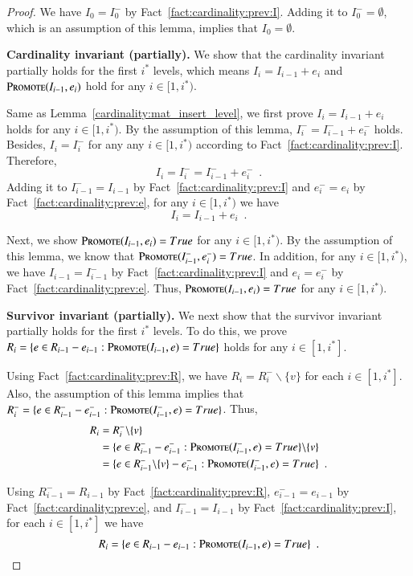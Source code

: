 \documentclass[11pt]{article}
\newcommand{\replacementTester}{\textsc{Promote}}
\begin{document}
\begin{proof}
We have $I_0=I_0^-$ by Fact~\ref{fact:cardinality:prev:I}.
Adding it to $I_0^-=\emptyset$, which is an assumption of this lemma, implies that $I_0 = \emptyset$.


\textbf{Cardinality invariant (partially). }
We show that the cardinality invariant partially holds for the first $i^*$ levels,  which means $I_i = I_{i-1} + e_i$ and $\replacementTester{}(I_{i-1}, e_i)$ hold for any $i\in[1,i^*)$.

Same as Lemma~\ref{cardinality:mat_insert_level}, we first prove $I_i = I_{i-1} + e_i$ holds for any $i\in[1,i^*)$.
By the assumption of this lemma, $I_{i}^-=I_{i - 1}^- + e_i^-$ holds.
Besides, $I_i = I_i^-$  for any any $i\in[1,i^*)$ according to Fact~\ref{fact:cardinality:prev:I}.
Therefore,
$$ I_i = I_i^- = I_{i - 1}^- + e_i^-  \enspace.
$$
Adding it to $I_{i - 1}^-=I_{i - 1}$ by Fact~\ref{fact:cardinality:prev:I} and 
$e_i^-=e_i$ by Fact~\ref{fact:cardinality:prev:e},
for any $i\in[1,i^*)$ we have
$$
I_i = I_{i - 1} + e_i \enspace.
$$

Next, we show $\replacementTester{}(I_{i - 1}, e_i)=True$ for any $i\in[1,i^*)$. By the assumption of this lemma, we know that $\replacementTester{}(I_{i - 1}^-, e_i^-)=True$. In addition, for any $i\in[1,i^*)$, we have $I_{i - 1}=I_{i - 1}^-$ by Fact~\ref{fact:cardinality:prev:I} and $e_i=e_i^-$ by Fact~\ref{fact:cardinality:prev:e}. Thus, $\replacementTester{}(I_{i - 1}, e_i)=True$ for any $i\in[1,i^*)$.

\textbf{Survivor invariant (partially). }
We next show that the survivor invariant partially holds for the first $i^*$ levels.
To do this, we prove
$R_i = \{ e \in R_{i-1} - e_{i-1}: \replacementTester{}(I_{i-1}, e) = True\}$ holds for any $i\in[1,i^*]$.

Using Fact~\ref{fact:cardinality:prev:R},  we have $R_i = R_i^- \backslash \{v\}$ for each $i \in [1, i^*]$.
Also, the assumption of this lemma implies that 
$R_i^- = \{ e \in R_{i-1}^- - e_{i-1}^-: \replacementTester{}(I_{i-1}^-, e) = True\}$. Thus,
\begin{align*}
    R_i &= R_i^- \backslash \{v\} \\
    &= \{ e \in R_{i-1}^- - e_{i-1}^-: \replacementTester{}(I_{i-1}^-, e) = True\} \backslash \{v\} \\
    &= \{ e \in R_{i-1}^- \backslash \{v\} - e_{i-1}^-: \replacementTester{}(I_{i-1}^-, e) = True\} \enspace.
\end{align*}

Using $R_{i-1}^-=R_{i-1}$ by Fact~\ref{fact:cardinality:prev:R}, $e_{i-1}^-=e_{i-1}$ by Fact~\ref{fact:cardinality:prev:e}, and $I_{i-1}^-=I_{i-1}$ by Fact~\ref{fact:cardinality:prev:I}, for each $i\in[1,i^*]$ we have
$$
R_i = \{ e \in R_{i-1} - e_{i-1}: \replacementTester{}(I_{i-1}, e) = True\} \enspace.
$$



\end{proof}
\end{document}
